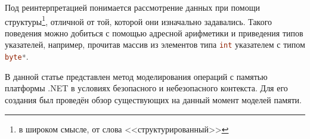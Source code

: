 Под реинтерпретацией понимается рассмотрение данных при помощи структуры\footnote{в широком смысле, от слова <<структурированный>>}, отличной от той, которой они изначально задавались. Такого поведения можно добиться с помощью адресной арифметики и приведения типов указателей, например, прочитав массив из элементов типа \lstinline[language=csharp]{int} указателем с типом \lstinline[language=csharp]{byte*}.

В данной статье представлен метод моделирования операций с памятью платформы .NET в условиях безопасного и небезопасного контекста. Для его создания был проведён обзор существующих на данный момент моделей памяти.
